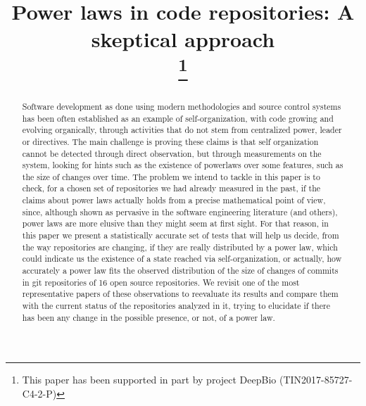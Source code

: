 \documentclass[conference]{IEEEtran}
\begin{document}
\title{Power laws in code repositories: A skeptical approach\\
	\thanks{This paper has been supported in part by
		project DeepBio (TIN2017-85727-C4-2-P)}
}

\author{
	\and
}

\maketitle

\begin{abstract}
  
Software development as done using modern methodologies and source
control systems has been often established as an example of
self-organization, with code growing and evolving organically, through
activities that do not stem from centralized power, leader or
directives.  The main challenge is proving these claims is that self
organization cannot be detected through direct observation, but
through measurements on the system, looking for hints such as the
existence of powerlaws over some features, such as the size of changes
over time.  The problem we intend to tackle in this paper is to check,
for a chosen set of repositories we had already measured in the past,
if the claims about power laws actually holds from a precise
mathematical point of view, since, although shown as pervasive in the
software engineering literature (and others), power laws are more
elusive than they might seem at first sight. For that reason, in this
paper we present a statistically accurate set of tests that will help
us decide, from the way repositories are changing, if they are really
distributed by a power law, which could indicate us the existence of a
state reached via self-organization, or actually, how accurately a
power law fits the observed distribution of the size of changes of
commits in git repositories of 16 open source repositories.  We
revisit one of the most representative papers of these observations to
reevaluate its results and compare them with the current status of the
repositories analyzed in it, trying to elucidate if there has been any
change in the possible presence, or not, of a power law.

\end{abstract}
\end{document}

